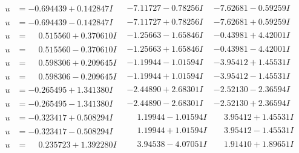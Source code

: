\documentclass[1p]{elsarticle_modified}
\theoremstyle{definition}
\begin{document}
$$\begin{array}{c|c|c}
\begin{aligned}
u &= -0.694439 + 0.142847 I\end{aligned}
 & -7.11727 - 0.78256 I & -7.62681 - 0.59259 I \\ \hline\begin{aligned}
u &= -0.694439 - 0.142847 I\end{aligned}
 & -7.11727 + 0.78256 I & -7.62681 + 0.59259 I \\ \hline\begin{aligned}
u &= \phantom{-}0.515560 + 0.370610 I\end{aligned}
 & -1.25663 - 1.65846 I & -0.43981 + 4.42001 I \\ \hline\begin{aligned}
u &= \phantom{-}0.515560 - 0.370610 I\end{aligned}
 & -1.25663 + 1.65846 I & -0.43981 - 4.42001 I \\ \hline\begin{aligned}
u &= \phantom{-}0.598306 + 0.209645 I\end{aligned}
 & -1.19944 - 1.01594 I & -3.95412 + 1.45531 I \\ \hline\begin{aligned}
u &= \phantom{-}0.598306 - 0.209645 I\end{aligned}
 & -1.19944 + 1.01594 I & -3.95412 - 1.45531 I \\ \hline\begin{aligned}
u &= -0.265495 + 1.341380 I\end{aligned}
 & -2.44890 + 2.68301 I & -2.52130 - 2.36594 I \\ \hline\begin{aligned}
u &= -0.265495 - 1.341380 I\end{aligned}
 & -2.44890 - 2.68301 I & -2.52130 + 2.36594 I \\ \hline\begin{aligned}
u &= -0.323417 + 0.508294 I\end{aligned}
 & \phantom{-}1.19944 - 1.01594 I & \phantom{-}3.95412 + 1.45531 I \\ \hline\begin{aligned}
u &= -0.323417 - 0.508294 I\end{aligned}
 & \phantom{-}1.19944 + 1.01594 I & \phantom{-}3.95412 - 1.45531 I \\ \hline\begin{aligned}
u &= \phantom{-}0.235723 + 1.392280 I\end{aligned}
 & \phantom{-}3.94538 - 4.07051 I & \phantom{-}1.91410 + 1.89651 I \\ \hline\begin{aligned}

\end{aligned}
\end{array}$$
\end{document}
